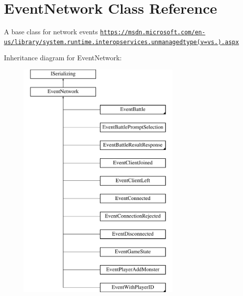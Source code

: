 \hypertarget{class_event_network}{\section{Event\-Network Class Reference}
\label{class_event_network}
}


A base class for network events \href{https://msdn.microsoft.com/en-us/library/system.runtime.interopservices.unmanagedtype(v=vs.110).aspx}{\tt https\-://msdn.\-microsoft.\-com/en-\/us/library/system.\-runtime.\-interopservices.\-unmanagedtype(v=vs.).\-aspx}  


Inheritance diagram for Event\-Network\-:\begin{figure}[H]
\begin{center}
\leavevmode
\includegraphics[height=12.000000cm]{class_event_network}
\end{center}
\end{figure}
